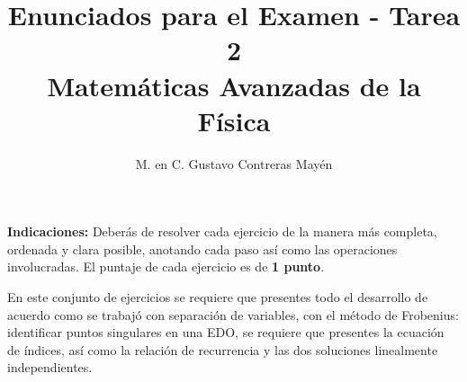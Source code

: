 
\title{Enunciados para el Examen - Tarea 2 \\[0.3em]  \large{Matemáticas Avanzadas de la Física}\vspace{-3ex}}
\author{M. en C. Gustavo Contreras Mayén}
\date{ }

\vspace{-4cm}
\maketitle
\fontsize{14}{14}\selectfont

\textbf{Indicaciones: } Deberás de resolver cada ejercicio de la manera más completa, ordenada y clara posible, anotando cada paso así como las operaciones involucradas. El puntaje de cada ejercicio es de \textbf{1 punto}.
\par
En este conjunto de ejercicios se requiere que presentes todo el desarrollo de acuerdo como se trabajó con separación de variables, con el método de Frobenius: identificar puntos singulares en una EDO, se requiere que presentes la ecuación de índices, así como la relación de recurrencia y las dos soluciones linealmente independientes.

